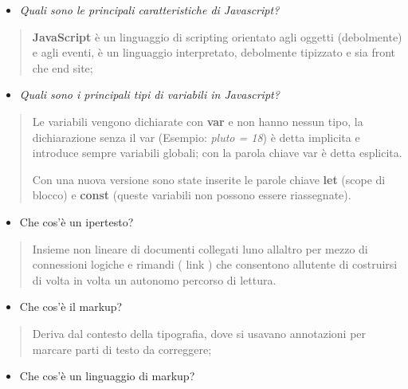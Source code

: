 \begin{itemize}
\item
  \emph{Quali sono le principali caratteristiche di Javascript?}
\end{itemize}

\begin{quote}
\textbf{JavaScript} è un linguaggio di scripting orientato agli oggetti
(debolmente) e agli eventi, è un linguaggio interpretato, debolmente
tipizzato e sia front che end site;
\end{quote}

\begin{itemize}
\item
  \emph{Quali sono i principali tipi di variabili in Javascript?}
\end{itemize}

\begin{quote}
Le variabili vengono dichiarate con \textbf{var} e non hanno nessun
tipo, la dichiarazione senza il var (Esempio: \emph{pluto = 18}) è detta
implicita e introduce sempre variabili globali; con la parola chiave var
è detta esplicita.

Con una nuova versione sono state inserite le parole chiave \textbf{let}
(scope di blocco) e \textbf{const} (queste variabili non possono essere
riassegnate).
\end{quote}

\begin{itemize}
\item
  Che cos'è un ipertesto?
\end{itemize}

\begin{quote}
Insieme non lineare di documenti collegati l\textquotesingle uno
all\textquotesingle altro per mezzo di connessioni logiche e rimandi (
link ) che consentono all\textquotesingle utente di costruirsi di volta
in volta un autonomo percorso di lettura.
\end{quote}

\begin{itemize}
\item
  Che cos'è il markup?
\end{itemize}

\begin{quote}
Deriva dal contesto della tipografia, dove si usavano annotazioni per
marcare parti di testo da correggere;
\end{quote}

\begin{itemize}
\item
  Che cos'è un linguaggio di markup?
\end{itemize}


